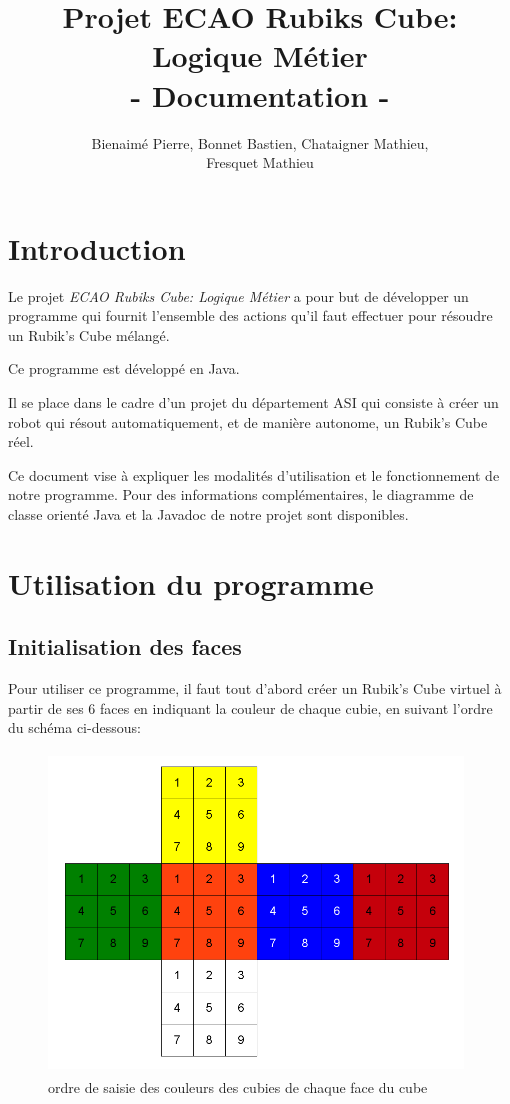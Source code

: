 \documentclass[a4paper,12pt]{article}
\title{Projet ECAO Rubiks Cube: Logique Métier\\ - Documentation -}
\author{Bienaimé Pierre, Bonnet Bastien, Chataigner Mathieu,\\ Fresquet Mathieu}
\begin{document}
\maketitle
\tableofcontents
\newpage
\section {Introduction}
Le projet \textit{ECAO Rubiks Cube: Logique Métier} a pour but de développer un programme qui fournit l'ensemble des actions qu'il faut effectuer pour résoudre un Rubik's Cube mélangé.

Ce programme est développé en Java.

Il se place dans le cadre d'un projet du département ASI qui consiste à créer un robot qui résout automatiquement, et de manière autonome, un Rubik's Cube réel.

Ce document vise à expliquer les modalités d'utilisation et le fonctionnement de notre programme. Pour des informations complémentaires, le diagramme de classe orienté Java et la Javadoc de notre projet sont disponibles.

\section{Utilisation du programme}


\subsection{Initialisation des faces}
Pour utiliser ce programme, il faut tout d'abord créer un Rubik's Cube virtuel à partir de ses 6 faces en indiquant la couleur de chaque cubie, en suivant l'ordre du schéma ci-dessous:

\begin{center}
\begin{figure}[!h]
\includegraphics[width=11cm, height=8.5cm]{cube.png}
\caption{ordre de saisie des couleurs des cubies de chaque face du cube}
\end{figure}
\end{center}
\end{document}
